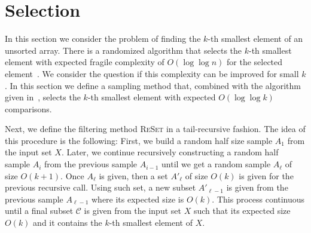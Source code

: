 \section{Selection}
\label{sec:selection}



In this section we consider the problem of finding the $k$-th smallest element of an unsorted array.
There is a randomized algorithm that selects the $k$-th smallest element with expected fragile complexity of $O(\log \log n)$ for the selected element~\cite{afshani:fragile-ESA19}.
We consider the question if this complexity can be improved for small $k$.
In this section we define a sampling method that, combined with the algorithm given in~\cite{afshani:fragile-ESA19}, selects the $k$-th smallest element with expected $O(\log \log k)$ comparisons.

Next, we define the filtering method \textsc{ReSet} in a tail-recursive fashion. The idea of this procedure is the following: First, we build a random half size sample $A_1$ from the input set $X$. Later, we continue recursively constructing a random half sample $A_i$ from the previous sample $A_{i-1}$ until we get a random sample $A_{\ell}$ of size $O(k+1)$. Once $A_{\ell}$ is given, then a set $A'_{\ell}$ of size $O(k)$ is given for the previous recursive call. Using such set, a new subset $A'_{\ell-1}$ is given from the previous sample $A_{\ell-1}$ where its expected size is $O(k)$. This process continuous until a final subset $\mathcal{C}$ is given from the input set $X$ such that its expected size $O(k)$ and it contains the $k$-th smallest element of $X$. 

\noindent{}


